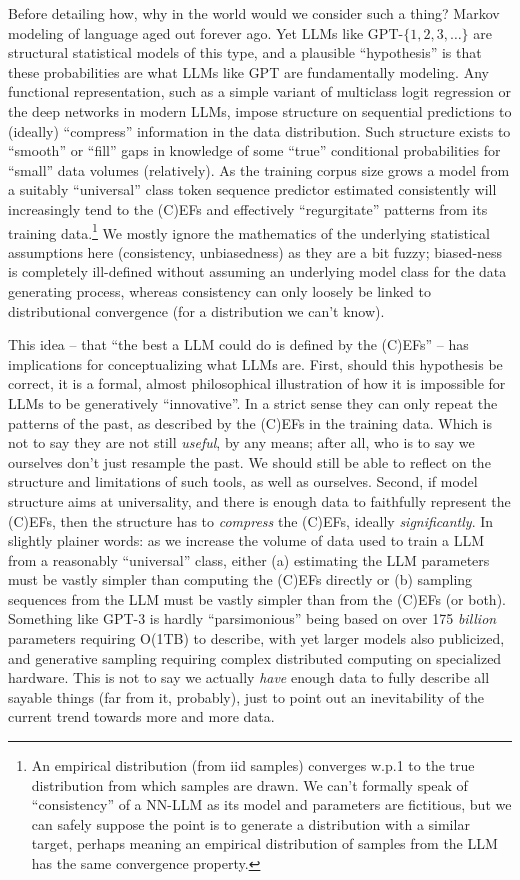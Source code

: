 \documentclass[11pt, oneside]{amsart}   	%
\begin{document}
Before detailing how, why in the world would we consider such a thing? Markov modeling of language aged out forever ago. Yet LLMs like GPT-$\{1,2,3,\dotsc\}$ are structural statistical models of this type, and a plausible ``hypothesis'' is that these probabilities are what LLMs like GPT are fundamentally modeling. Any functional representation, such as a simple variant of multiclass logit regression or the deep networks in modern LLMs, impose structure on sequential predictions to (ideally) ``compress'' information in the data distribution. Such structure exists to ``smooth'' or ``fill'' gaps in knowledge of some ``true'' conditional probabilities for ``small'' data volumes (relatively). As the training corpus size grows a model from a suitably ``universal'' class token sequence predictor estimated consistently will increasingly tend to the (C)EFs and effectively ``regurgitate'' patterns from its training data.\footnote{An empirical distribution (from iid samples) converges w.p.1 to the true distribution from which samples are drawn. We can't formally speak of ``consistency'' of a NN-LLM as its model and parameters are fictitious, but we can safely suppose the point is to generate a distribution with a similar target, perhaps meaning an empirical distribution of samples from the LLM has the same convergence property.} We mostly ignore the mathematics of the underlying statistical assumptions here (consistency, unbiasedness) as they are a bit fuzzy; biased-ness is completely ill-defined without assuming an underlying model class for the data generating process, whereas consistency can only loosely be linked to distributional convergence (for a distribution we can't know). 

This idea -- that ``the best a LLM could do is defined by the (C)EFs'' -- has implications for conceptualizing what LLMs are. First, should this hypothesis be correct, it is a formal, almost philosophical illustration of how it is impossible for LLMs to be generatively ``innovative''. In a strict sense they can only repeat the patterns of the past, as described by the (C)EFs in the training data. Which is not to say they are not still {\em useful}, by any means; after all, who is to say we ourselves don't just resample the past. We should still be able to reflect on the structure and limitations of such tools, as well as ourselves. Second, if model structure aims at universality, and there is enough data to faithfully represent the (C)EFs, then the structure has to {\em compress} the (C)EFs, ideally {\em significantly}. In slightly plainer words: as we increase the volume of data used to train a LLM from a reasonably ``universal''  class, either (a) estimating the LLM parameters must be vastly simpler than computing the (C)EFs directly or (b) sampling sequences from the LLM must be vastly simpler than from the (C)EFs (or both). Something like GPT-3 is hardly ``parsimonious'' being based on over 175 {\em billion} parameters requiring O(1TB) to describe, with yet larger models also publicized, and generative sampling requiring complex distributed computing on specialized hardware. This is not to say we actually {\em have} enough data to fully describe all sayable things (far from it, probably), just to point out an inevitability of the current trend towards more and more data. 
\end{document}
